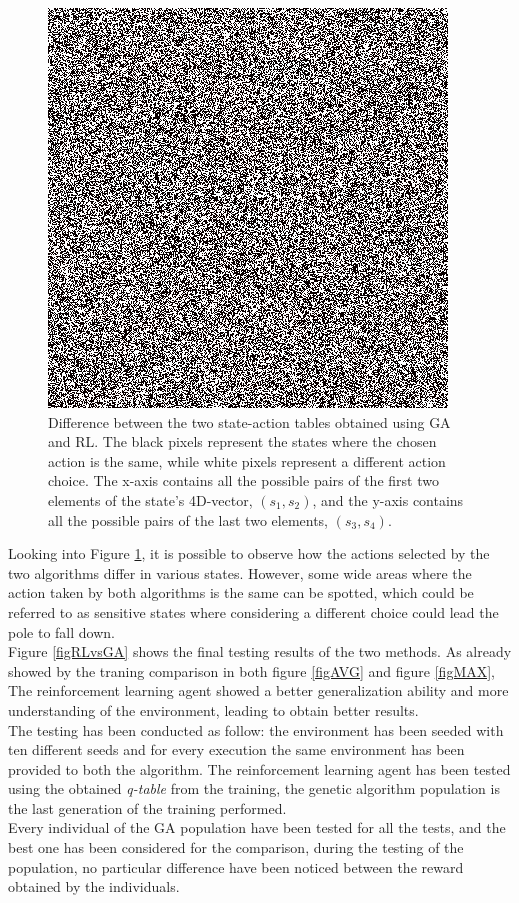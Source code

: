 \begin{figure}[H]
	\centering
	\includegraphics [scale = 0.7]{Images/diff.png}
	\caption{Difference between the two state-action tables obtained using GA and RL. The black pixels represent the states where the chosen action is the same, while white pixels represent a different action choice. The x-axis contains all the possible pairs of the first two elements of the state's 4D-vector, $(s_1,s_2)$, and the y-axis contains all the possible pairs of the last two elements, $(s_3,s_4)$. }
	\label{figTABLEDIFF}
\end{figure}

Looking into Figure \ref{figTABLEDIFF}, it is possible to observe how the actions selected by the two algorithms differ in various states. However, some wide areas where the action taken by both algorithms is the same can be spotted, which could be referred to as sensitive states where considering a different choice could lead the pole to fall down.\\

Figure \ref{figRLvsGA} shows the final testing results of the two methods. As already showed by the traning comparison in both figure \ref{figAVG} and figure \ref{figMAX}, The reinforcement learning agent showed a better generalization ability and more understanding of the environment, leading to obtain better results.\\
The testing has been conducted as follow: the environment has been seeded with ten different seeds and for every execution the same environment has been provided to both the algorithm.
The reinforcement learning agent has been tested using the obtained \textit{q-table} from the training, the genetic algorithm population is the last generation of the training performed.\\
Every individual of the GA population have been tested for all the tests, and the best one has been considered for the comparison, during the testing of the population, no particular difference have been noticed between the reward obtained by the individuals.

